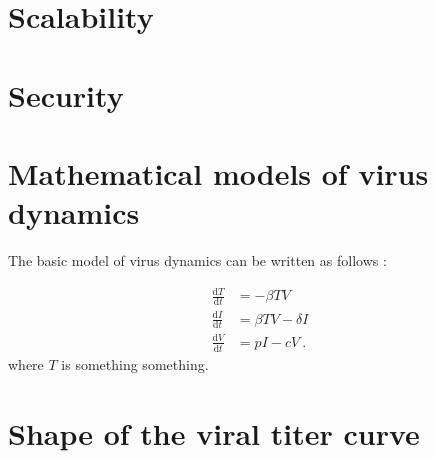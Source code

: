 \documentclass[grad,lot,lof,11pt,oneside,onehalfspace]{RUthesis}
\newcommand{\dif}{\mathrm{d}}
\begin{document}
\section{Scalability}
\section{Security}




\section{Mathematical models of virus dynamics}

The basic model of virus dynamics can be written as follows \cite{nowak-may, perelson02, bonhoeffer97}: 

\begin{align*}
\frac{\dif T}{\dif t} &= -\beta T V \\
\frac{\dif I}{\dif t} &= \beta T V - \delta I \label{basic}\\
\frac{\dif V}{\dif t} &=  p I - c V\ .\nonumber
\end{align*}
where $T$ is something something.


\section{Shape of the viral titer curve}
\end{document}
